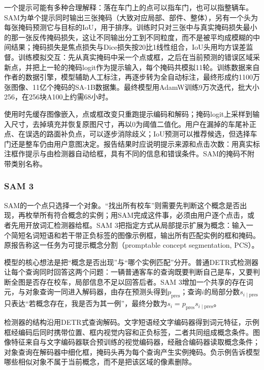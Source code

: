 一个提示可能有多种合理解释：落在车门上的点可以指车门，也可以指整辆车。SAM为单个提示同时输出三张掩码（大致对应局部、部件、整体），另有一个头为每张掩码预测它与目标的IoU，用于排序。训练时只对三张中与真实掩码损失最小的那一张反传掩码损失，这让不同输出分工到不同粒度，而不是被平均成模糊的中间结果；掩码损失是焦点损失与Dice损失按20比1线性组合，IoU头用均方误差监督。训练模拟交互：先从真实掩码中采一个点或框，之后在当前预测的错误区域采新点，并把上一轮的掩码logit作为提示输入，每个掩码共模拟11轮。训练数据来自作者的数据引擎，模型辅助人工标注，再逐步转为全自动标注，最终形成约1100万张图像、11亿个掩码的SA-1B数据集。最终模型用AdamW训练9万次迭代，批大小256，在256块A100上约需68小时。

使用时先缓存图像嵌入，点或框改变只重跑提示编码和解码；掩码logit上采样到输入尺寸，去掉填充并恢复原图尺寸，再以0为阈值二值化。用户在漏掉的车尾补正点、在误选的路面补负点，可以逐步消除歧义；IoU预测可以推荐候选，但选择车门还是整车仍由用户意图决定。报告结果时应说明提示来源和点击次数：用真实标注框作提示与由检测器自动给框，具有不同的信息和错误条件。SAM的掩码不附带类别名称。

\subsubsection{SAM 3}
\label{sec:vision-recognition-sam3}

SAM的一个点只选择一个对象。“找出所有校车”则需要先判断这个概念是否出现，再枚举所有符合概念的实例；用SAM完成这件事，必须由用户逐个点击，或者先用开放词汇检测器给框。SAM 3把指定方式从局部提示扩展为概念：输入一个简短名词短语和若干带正负标签的图像示例框，输出所有匹配实例的框和掩码。原报告称这一任务为可提示概念分割（promptable concept segmentation, PCS）。

模型的核心想法是把“概念是否出现”与“哪个实例匹配”分开。普通DETR式检测器让每个查询同时回答这两个问题：一辆普通客车的查询既要判断自己是车，又要判断全图是否存在校车，局部信息不足以回答后者。SAM 3增加一个共享的存在词元，与对象查询一同进入解码器，由存在预测头得到$p_{\mathrm{pres}}$；查询$i$的局部分数$s_{i\mid\mathrm{pres}}$只表达“若概念存在，我是否为其一例”，最终分数为$s_i=p_{\mathrm{pres}}s_{i\mid\mathrm{pres}}$。

检测器的结构沿用DETR式查询解码。文字短语经文字编码器得到词元特征，示例框经编码后同时携带位置、框内视觉内容和正负标签，二者共同组成概念条件。图像特征来自与文字编码器联合预训练的视觉编码器，经融合编码器读取概念条件；对象查询在解码器中细化框，掩码头再为每个查询产生实例掩码。负示例告诉模型哪些相似对象不属于当前概念，而不是把该区域的像素删除。

